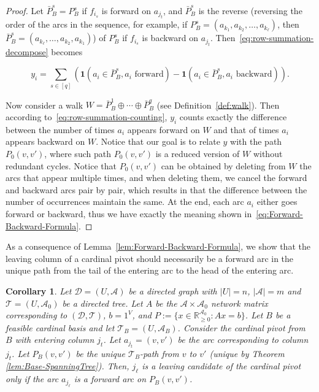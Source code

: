 \documentclass[11pt]{article}
\newcommand{\R}{\mathbb{R}}
\newtheorem{corollary}[theorem]{Corollary}
\begin{document}
\begin{proof}
    
    Let $\bar{P}_B^s=P_B^s$ if $f_{i_s}$ is forward on $a_{j_t}$, and $\bar{P}_B^s$ is the reverse (reversing the order of the arcs in the sequence, for example, if $P_B^s=(a_{k_1},a_{k_2},\dots,a_{k_\ell})$, then $\bar{P}_B^s=(a_{k_\ell},\dots,a_{k_2},a_{k_1})$) of $P_B^s$ if $f_{i_s}$ is backward on $a_{j_t}$. Then~\eqref{eq:row-summation-decompose} becomes

    \begin{equation}\label{eq:row-summation-counting}
        y_i=\sum_{s\in[q]}(\mathbf{1}(a_i\in \bar{P}_B^s,\textrm{$a_i$ forward})-\mathbf{1}(a_i\in \bar{P}_B^s,\textrm{$a_i$ backward})).
    \end{equation}

    Now consider a walk $W=\bar{P}_B^1\oplus\cdots\oplus \bar{P}_B^q$ (see Definition~\ref{def:walk}). Then according to~\eqref{eq:row-summation-counting}, $y_i$ counts exactly the difference between the number of times $a_i$ appears forward on $W$ and that of times $a_i$ appears backward on $W$. Notice that our goal is to relate $y$ with the path $P_0(v,v')$, where such path $P_0(v,v')$ is a reduced version of $W$ without redundant cycles. Notice that $P_0(v,v')$ can be obtained by deleting from $W$ the arcs that appear multiple times, and when deleting them, we cancel the forward and backward arcs pair by pair, which results in that the difference between the number of occurrences maintain the same. At the end, each arc $a_i$ either goes forward or backward, thus we have exactly the meaning shown in~\eqref{eq:Forward-Backward-Formula}.
\end{proof}

As a consequence of Lemma~\ref{lem:Forward-Backward-Formula}, we show that the leaving column of a cardinal pivot should necessarily be a forward arc in the unique path from the tail of the entering arc to the head of the entering arc. 
\begin{corollary}\label{lem:Leaving-Forward}
Let $\mathcal{D}=(U,\mathcal{A})$ be a directed graph with $|U|=n$, $|\mathcal{A}|=m$ and $\mathcal{T}=(U,\mathcal{A}_0)$ be a directed tree. Let $A$ be the $\mathcal{A}\times \mathcal{A}_0$ network matrix corresponding to $(\mathcal{D},\mathcal{T})$, $b=1^V$, and $P:=\{x\in \R^{\mathcal{A}_0}_{\ge 0}: Ax=b \}$. 
Let $B$ be a feasible cardinal basis and let $\mathcal{T}_B=(U,\mathcal{A}_B)$. 
Consider the cardinal pivot from $B$ with entering column $j_t$. Let $a_{j_t}=(v,v')$ be the arc corresponding to column $j_t$. Let $P_B(v,v')$ be the unique $\mathcal{T}_B$-path from $v$ to $v'$ (unique by Theorem \ref{lem:Base-SpanningTree}). Then, $j_\ell$ is a leaving candidate of the cardinal pivot only if the arc $a_{j_\ell}$ is a forward arc on $P_B(v,v')$.
\end{corollary}
\end{document}
